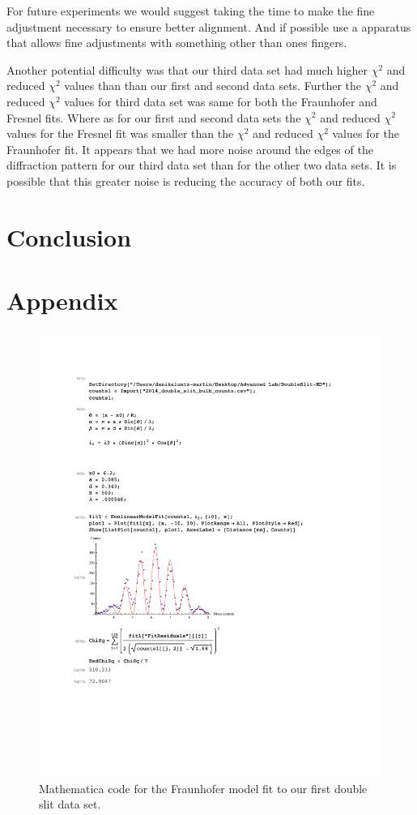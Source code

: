 \documentclass[prb,preprint]{revtex4-1}
\begin{document}
For future experiments we would suggest taking the time to make the fine adjustment necessary to ensure better alignment. And if possible use a apparatus that allows fine adjustments with something other than ones fingers.

Another potential difficulty was that our third data set had much higher $\chi^2$ and reduced $\chi^2$ values than than our first and second data sets. Further the $\chi^2$ and reduced $\chi^2$ values for third data set was same for both the Fraunhofer and Fresnel fits. Where as for our first and second data sets the $\chi^2$ and reduced $\chi^2$ values for the Fresnel fit was smaller than the $\chi^2$ and reduced $\chi^2$ values for the Fraunhofer fit. It appears that we had more noise around the edges of the diffraction pattern for our third data set than for the other two data sets. It is possible that this greater noise is reducing the accuracy of both our fits.

\section{Conclusion}

\section{Appendix}

\begin{figure}[h!]
\centering
\includegraphics[width=6in]{DoubleSlitFraun1.pdf}
\caption{Mathematica code for the Fraunhofer model fit to our first double slit data set.}
\label{DoubleSlitFraun1}
\end{figure}
\end{document}

